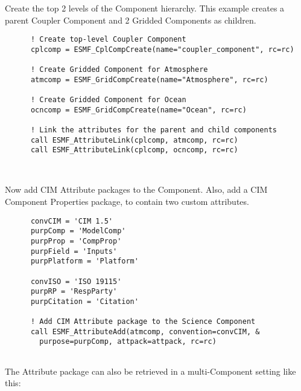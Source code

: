  \begin{sloppypar}
      Create the top 2 levels of the Component hierarchy.  This example creates
      a parent Coupler Component and 2 Gridded Components as children.
  \end{sloppypar} 

 \begin{verbatim}
      ! Create top-level Coupler Component
      cplcomp = ESMF_CplCompCreate(name="coupler_component", rc=rc)

      ! Create Gridded Component for Atmosphere
      atmcomp = ESMF_GridCompCreate(name="Atmosphere", rc=rc)

      ! Create Gridded Component for Ocean
      ocncomp = ESMF_GridCompCreate(name="Ocean", rc=rc)

      ! Link the attributes for the parent and child components
      call ESMF_AttributeLink(cplcomp, atmcomp, rc=rc)
      call ESMF_AttributeLink(cplcomp, ocncomp, rc=rc)

 
\end{verbatim}
 

  \begin{sloppypar}
      Now add CIM Attribute packages to the Component.  Also, add
      a CIM Component Properties package, to contain two custom attributes.
  \end{sloppypar} 

 \begin{verbatim}
      convCIM = 'CIM 1.5'
      purpComp = 'ModelComp'
      purpProp = 'CompProp'
      purpField = 'Inputs'
      purpPlatform = 'Platform'

      convISO = 'ISO 19115'
      purpRP = 'RespParty'
      purpCitation = 'Citation'

      ! Add CIM Attribute package to the Science Component
      call ESMF_AttributeAdd(atmcomp, convention=convCIM, &
        purpose=purpComp, attpack=attpack, rc=rc)
 
\end{verbatim}
 

  \begin{sloppypar}
      The Attribute package can also be retrieved in a multi-Component
      setting like this:
  \end{sloppypar} 

